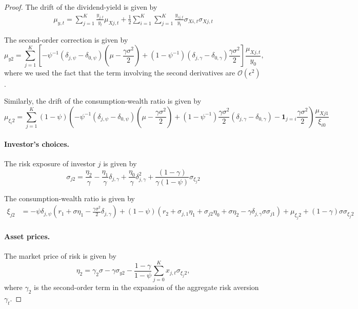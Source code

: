 \documentclass[11pt,english]{article}
\begin{document}
\begin{proof}
The drift of the dividend-yield is given by
\begin{align}
    \mu_{y,t} = \sum_{j=1}^K \frac{y_{j,t}}{y_t} \mu_{Xj,t} + \frac{1}{2} \sum_{i=1}^K \sum_{j=1}^K \frac{y_{ij,t}}{y_t} \sigma_{Xi,t} \sigma_{Xj,t}
\end{align}
    
The second-order correction is given by 
\begin{equation}
    \mu_{y2} = \sum_{j=1}^K\left[- \psi^{-1}(\delta_{j,\psi}-\delta_{0,\psi}) \left( \mu - \frac{\gamma \sigma^2}{2} \right) + (1- \psi^{-1}) ( \delta_{j,\gamma}- \delta_{0,\gamma}) \frac{\gamma \sigma^2}{2} \right] \frac{\mu_{Xj,t}  }{y_0},
\end{equation}
where we used the fact that the term involving the second derivatives are $\mathcal{O}(\epsilon^2)$.

Similarly, the drift of the consumption-wealth ratio is given by
\begin{equation*}
    \mu_{\xi_i2} = \sum_{j=1}^K (1-\psi) \left( -\psi^{-1} (\delta_{j,\psi}-\delta_{0,\psi})  \left(\mu -\frac{\gamma \sigma^2}{2}\right) + (1-\psi^{-1}) \frac{ \gamma \sigma^2 }{2} ( \delta_{j,\gamma}- \delta_{0,\gamma})   - \mathbf{1}_{j=i} \frac{\gamma\sigma^2}{2} \right) \frac{\mu_{Xj1}}{\xi_{i0}}
\end{equation*}
    
\paragraph{Investor's choices.} The risk exposure of investor $j$ is given by
\begin{equation*}
    \sigma_{j2} = \frac{\eta_2}{\gamma} - \frac{\eta_1}{\gamma} \delta_{j,\gamma} + \frac{\eta_0}{\gamma} \delta_{j,\gamma}^2 + \frac{(1-\gamma)}{\gamma(1-\psi)} \sigma_{\xi_j2}
\end{equation*}

The consumption-wealth ratio is given by\small
\begin{align}
    \xi_{j2} &= -\psi \delta_{j,\psi} ( r_1 +  \sigma \eta_1 - \frac{\gamma \sigma^2}{2} \delta_{j,\gamma} ) + (1-\psi) (r_2 + \sigma_{j,1} \eta_1 + \sigma_{j2} \eta_0 + \sigma \eta_2 - \gamma \delta_{j,\gamma} \sigma \sigma_{j1})+\mu_{\xi_j2}+(1-\gamma) \sigma \sigma_{\xi_j2} \nonumber
\end{align}\normalsize

\paragraph{Asset prices.} The market price of risk is given by
\begin{equation*}
    \eta_2 = \gamma_2 \sigma  - \gamma \sigma_{y2} -  \frac{1-\gamma}{1-\psi}\sum_{j=0}^K x_{j,t}  \sigma_{\xi_j2},
\end{equation*}
where $\gamma_2$ is the second-order term in the expansion of the aggregate risk aversion $\gamma_t$.


\end{proof}
\end{document}
